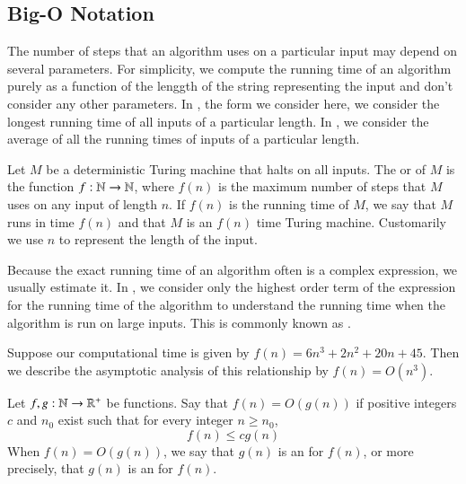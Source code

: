 \documentclass[12pt, a4paper, oneside, openright, titlepage]{book}
\begin{document}
\begin{appendices}
        
        \section{Big-O Notation}

        The number of steps that an algorithm uses on a particular input may depend on several parameters. For simplicity, we compute the running time of an algorithm purely as a function of the lenggth of the string representing the input and don't consider any other parameters. In , the form we consider here, we consider the longest running time of all inputs of a particular length. In , we consider the average of all the running times of inputs of a particular length.

        \begin{defn}
            Let $M$ be a deterministic Turing machine that halts on all inputs. The  or  of $M$ is the function $f:\mathbb N\rightarrow \mathbb N$, where $f(n)$ is the maximum number of steps that $M$ uses on any input of length $n$. If $f(n)$ is the running time of $M$, we say that $M$ runs in time $f(n)$ and that $M$ is an $f(n)$ time Turing machine. Customarily we use $n$ to represent the length of the input.
        \end{defn}

        Because the exact running time of an algorithm often is a complex expression, we usually estimate it. In , we consider only the highest order term of the expression for the running time of the algorithm to understand the running time when the algorithm is run on large inputs. This is commonly known as . 

        \begin{eg}
            Suppose our computational time is given by $f(n) = 6n^3 + 2n^2+20n+45$. Then we describe the asymptotic analysis of this relationship by $f(n) = O(n^3)$.
        \end{eg}

        \begin{defn}
            Let $f,g:\mathbb N\rightarrow\mathbb R^+$ be functions. Say that $f(n) = O(g(n))$ if positive integers $c$ and $n_0$ exist such that for every integer $n \geq n_0$, \begin{equation*}
                f(n) \leq cg(n)
            \end{equation*}
            When $f(n) = O(g(n))$, we say that $g(n)$ is an  for $f(n)$, or more precisely, that $g(n)$ is an  for $f(n)$.
        \end{defn}


\end{appendices}
\end{document}
